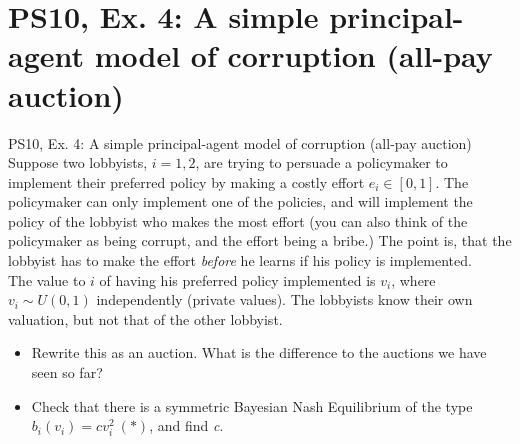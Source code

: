\section{PS10, Ex. 4: A simple principal-agent model of corruption (all-pay auction)}

\begin{frame}{PS10, Ex. 4: A simple principal-agent model of corruption (all-pay auction)}
    Suppose two lobbyists, $i = 1, 2$, are trying to persuade a policymaker to implement their preferred policy by making a costly effort $e_i\in[0, 1]$. The policymaker can only implement one of the policies, and will implement the policy of the lobbyist who makes the most effort (you can also think of the policymaker as being corrupt, and the effort being a bribe.) The point is, that the lobbyist has to make the effort \textit{before} he learns if his policy is implemented.\\\medskip
    The value to $i$ of having his preferred policy implemented is $v_i$, where $v_i\sim U(0, 1)$ independently (private values). The lobbyists know their own valuation, but not that of the other lobbyist.
    \begin{itemize}
      \item[(a)] Rewrite this as an auction. What is the difference to the auctions we have seen so far?
      \item[(b)] Check that there is a symmetric Bayesian Nash Equilibrium of the type $b_i(v_i) = cv_i^2\ (*)$, and find \textit{c}.
    \end{itemize}
    \vfill\null
\end{frame}

